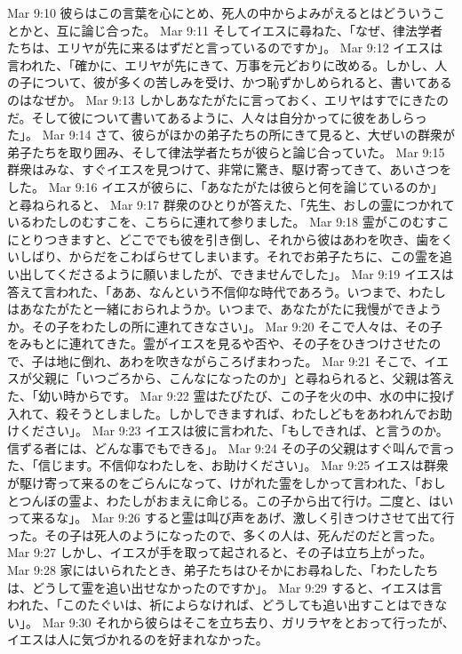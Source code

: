 Mar 9:10  彼らはこの言葉を心にとめ、死人の中からよみがえるとはどういうことかと、互に論じ合った。
Mar 9:11  そしてイエスに尋ねた、「なぜ、律法学者たちは、エリヤが先に来るはずだと言っているのですか」。
Mar 9:12  イエスは言われた、「確かに、エリヤが先にきて、万事を元どおりに改める。しかし、人の子について、彼が多くの苦しみを受け、かつ恥ずかしめられると、書いてあるのはなぜか。
Mar 9:13  しかしあなたがたに言っておく、エリヤはすでにきたのだ。そして彼について書いてあるように、人々は自分かってに彼をあしらった」。
Mar 9:14  さて、彼らがほかの弟子たちの所にきて見ると、大ぜいの群衆が弟子たちを取り囲み、そして律法学者たちが彼らと論じ合っていた。
Mar 9:15  群衆はみな、すぐイエスを見つけて、非常に驚き、駆け寄ってきて、あいさつをした。
Mar 9:16  イエスが彼らに、「あなたがたは彼らと何を論じているのか」と尋ねられると、
Mar 9:17  群衆のひとりが答えた、「先生、おしの霊につかれているわたしのむすこを、こちらに連れて参りました。
Mar 9:18  霊がこのむすこにとりつきますと、どこででも彼を引き倒し、それから彼はあわを吹き、歯をくいしばり、からだをこわばらせてしまいます。それでお弟子たちに、この霊を追い出してくださるように願いましたが、できませんでした」。
Mar 9:19  イエスは答えて言われた、「ああ、なんという不信仰な時代であろう。いつまで、わたしはあなたがたと一緒におられようか。いつまで、あなたがたに我慢ができようか。その子をわたしの所に連れてきなさい」。
Mar 9:20  そこで人々は、その子をみもとに連れてきた。霊がイエスを見るや否や、その子をひきつけさせたので、子は地に倒れ、あわを吹きながらころげまわった。
Mar 9:21  そこで、イエスが父親に「いつごろから、こんなになったのか」と尋ねられると、父親は答えた、「幼い時からです。
Mar 9:22  霊はたびたび、この子を火の中、水の中に投げ入れて、殺そうとしました。しかしできますれば、わたしどもをあわれんでお助けください」。
Mar 9:23  イエスは彼に言われた、「もしできれば、と言うのか。信ずる者には、どんな事でもできる」。
Mar 9:24  その子の父親はすぐ叫んで言った、「信じます。不信仰なわたしを、お助けください」。
Mar 9:25  イエスは群衆が駆け寄って来るのをごらんになって、けがれた霊をしかって言われた、「おしとつんぼの霊よ、わたしがおまえに命じる。この子から出て行け。二度と、はいって来るな」。
Mar 9:26  すると霊は叫び声をあげ、激しく引きつけさせて出て行った。その子は死人のようになったので、多くの人は、死んだのだと言った。
Mar 9:27  しかし、イエスが手を取って起されると、その子は立ち上がった。
Mar 9:28  家にはいられたとき、弟子たちはひそかにお尋ねした、「わたしたちは、どうして霊を追い出せなかったのですか」。
Mar 9:29  すると、イエスは言われた、「このたぐいは、祈によらなければ、どうしても追い出すことはできない」。
Mar 9:30  それから彼らはそこを立ち去り、ガリラヤをとおって行ったが、イエスは人に気づかれるのを好まれなかった。
